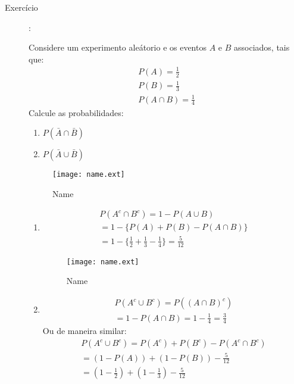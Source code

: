 \documentclass[11pt,a4paper]{book}
\begin{document}
\begin{description}
\item [Exercício]: 

Considere um experimento aleátorio e os eventos $A$ e $B$ associados, tais que:
\begin{align*}
  P(A)= \frac{1}{2}\\
  P(B)= \frac{1}{3}\\
  P(A \cap B)= \frac{1}{4}
\end{align*}
Calcule as probabilidades:
\begin{enumerate}[label=(\alph*)]
  \item $ P(\bar{A} \cap \bar{B})$
  \item $P(\bar{A} \cup \bar{B})$
\end{enumerate}
\begin{figure}[htpb]
  \centering
  \texttt{[image: name.ext]}
  \caption{Name}
  \label{fig:14}
\end{figure}
\begin{enumerate}[label=(\alph*)]
  \item \begin{align*}
      P(A^c \cap B^c) = 1- P(A \cup B) \\
      = 1- \{ P(A) + P(B) - P(A \cap B) \} \\
      =1 - \{ \frac{1}{2} + \frac{1}{3} -\frac{1}{4}\}= \frac{5}{12}
    \end{align*}
    \begin{figure}[htpb]
      \centering
      \texttt{[image: name.ext]}
      \caption{Name}
      \label{fig:15}
    \end{figure}
  \item \begin{align*}
      P(A^c \cup B^c) = P\left( \left( A \cap B\right)^c \right)\\
      = 1- P(A \cap B) = 1 - \frac{1}{4}= \frac{3}{4}
    \end{align*}  
    Ou de maneira similar:
    \begin{align*}
      P(A^c \cup B^c) = P(A^c) + P(B^c ) - P(A^c \cap B^c) \\
      = (1- P(A)) + (1- P(B)) - \frac{5}{12} \\
      = (1 - \frac{1}{2})+ (1 - \frac{1}{3})- \frac{5}{12}
    \end{align*}

\end{enumerate}

\end{description}
\end{document}
